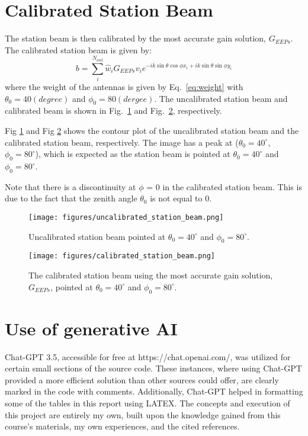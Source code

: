 \documentclass[10pt,a4paper,twocolumn]{paper}
\begin{document}
\section{Calibrated Station Beam}
The station beam is then calibrated by the most accurate gain solution, $G_{EEPs}$. The calibrated station beam is given by:
\begin{equation}
    b = \sum_{i}^{N_{ant}} \hat{w}_i G_{EEPs} v_i e^{-ik\sin\theta\cos\phi x_i + ik\sin\theta\sin\phi y_i}
    \label{eq:station_beam}
\end{equation}
where the weight of the antennas is given by Eq.~\ref{eq:weight} with $\theta_0 = 40(degree)$ and $\phi_0 = 80(dergee)$. The uncalibrated station beam and calibrated beam is shown in Fig.~\ref{fig:uncalibrated_station_beam} and Fig.~\ref{fig:calibrated_station_beam}, respectively.

Fig \ref{fig:uncalibrated_station_beam} and Fig \ref{fig:calibrated_station_beam} shows the contour plot of the uncalibrated station beam and the calibrated station beam, respectively. The image has a peak at ($\theta_0 = 40^{\circ}$, $\phi_0 = 80^{\circ}$), which is expected as the station beam is pointed at $\theta_0 = 40^{\circ}$ and $\phi_0 = 80^{\circ}$. 

Note that there is a discontinuity at $\phi$ = 0 in the calibrated station beam. This is due to the fact that the zenith angle $\theta_0$ is not equal to 0. 

\begin{figure}[H]
    \centering
    \texttt{[image: figures/uncalibrated\_station\_beam.png]}
    \caption{Uncalibrated station beam pointed at $\theta_0 = 40^{\circ}$ and $\phi_0 = 80^{\circ}$.}
    \label{fig:uncalibrated_station_beam}
\end{figure}

\begin{figure}[H]
    \centering
    \texttt{[image: figures/calibrated\_station\_beam.png]}
    \caption{The calibrated station beam using the most accurate gain solution, $G_{EEPs}$, pointed at $\theta_0 = 40^{\circ}$ and $\phi_0 = 80^{\circ}.$}
    \label{fig:calibrated_station_beam}
\end{figure}

\clearpage
\appendix
\section{Use of generative AI}
Chat-GPT 3.5, accessible for free at https://chat.openai.com/, was utilized for certain small sections of the source code. These instances, where using Chat-GPT provided a more efficient solution than other sources could offer, are clearly marked in the code with comments. Additionally, Chat-GPT helped in formatting some of the tables in this report using LATEX. The concepts and execution of this project are entirely my own, built upon the knowledge gained from this course's materials, my own experiences, and the cited references.

\printbibliography
\end{document}
